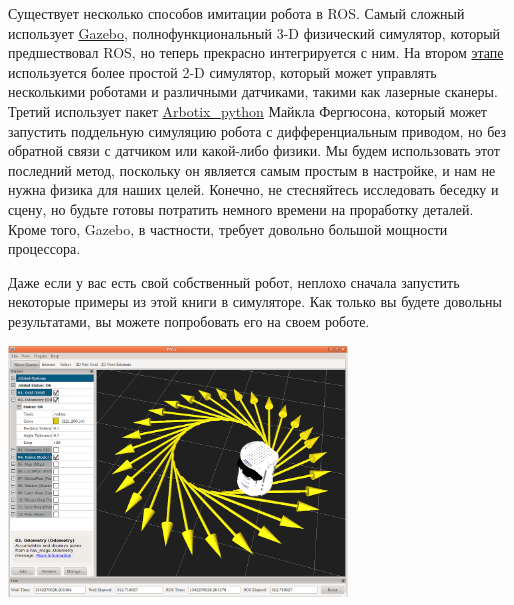 

Существует несколько способов имитации робота в ROS. Самый сложный использует \href{http://gazebosim.org/}{Gazebo}, полнофункциональный 3-D физический симулятор, который предшествовал ROS, но теперь прекрасно интегрируется с ним. На втором \href{http://wiki.ros.org/stage}{этапе }используется более простой 2-D симулятор, который может управлять несколькими роботами и различными датчиками, такими как лазерные сканеры. Третий использует пакет \href{http://ros.org/wiki/arbotix_python}{Arbotix\_python} Майкла Фергюсона, который может запустить поддельную симуляцию робота с дифференциальным приводом, но без обратной связи с датчиком или какой-либо физики. Мы будем использовать этот последний метод, поскольку он является самым простым в настройке, и нам не нужна физика для наших целей. Конечно, не стесняйтесь исследовать беседку и сцену, но будьте готовы потратить немного времени на проработку деталей. Кроме того, Gazebo, в частности, требует довольно большой мощности процессора. 

Даже если у вас есть свой собственный робот, неплохо сначала запустить некоторые примеры из этой книги в симуляторе. Как только вы будете довольны результатами, вы можете попробовать его на своем роботе.



\includegraphics[width=9cm]{.gitbook/assets/snimok-ekrana-2020-05-29-v-21.16.58.png}

